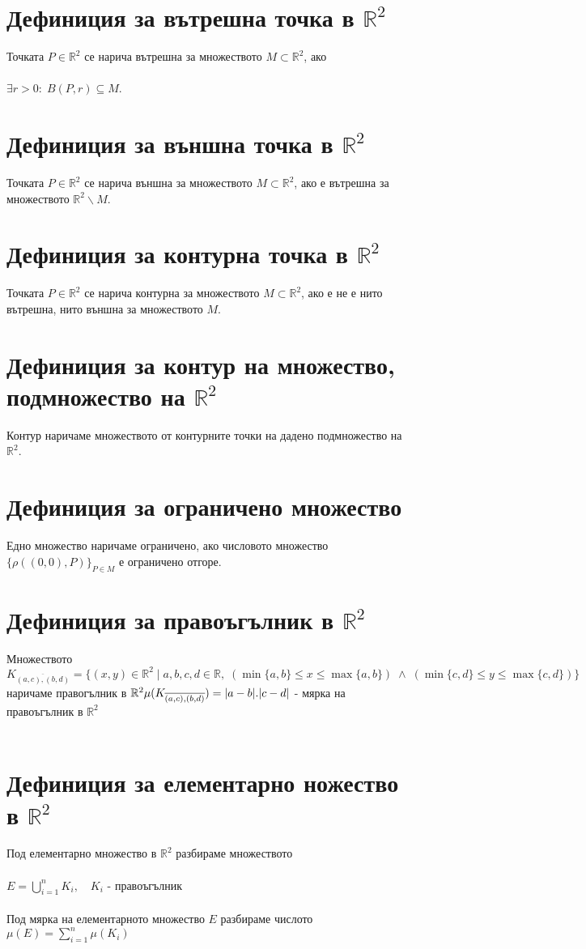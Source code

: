 \documentclass[14pt]{extarticle}
\newcommand{\R}{\mathbb{R}}
\newcommand{\Sum}{\displaystyle\sum}
\begin{document}
\section*{Дефиниция за вътрешна точка в \(\R^2\)}
Точката \(P \in \R^2\) се нарича вътрешна за множеството \(M \subset \R^2\), ако \\\\
\(\exists r > 0 : \; B(P,r) \subseteq M\).
\section*{Дефиниция за външна точка в \(\R^2\)}
Точката \(P \in \R^2\) се нарича външна за множеството \(M \subset \R^2\), ако е вътрешна за множеството \(\R^2\backslash M\).
\section*{Дефиниция за контурна точка в \(\R^2\)}
Точката \(P \in \R^2\) се нарича контурна за множеството \(M \subset \R^2\), ако е не е нито вътрешна, нито външна за множеството \(M\).
\section*{Дефиниция за контур на множество, подмножество на \(\R^2\)}
Контур наричаме множеството от контурните точки на дадено подмножество на \(\R^2\).
\section*{Дефиниция за ограничено множество}
Едно множество наричаме ограничено, ако числовото множество \(\{\rho((0, 0), P)\}_{P \in M}\) е ограничено отгоре.  
\section*{Дефиниция за правоъгълник в \(\R^2\)}
Множеството \(K_{\overline{(a, c), (b, d)}} = \{(x, y) \in \R^2 \; | \; a, b, c, d \in \R, \;  (\min\{a, b\} \leq x \leq \max\{a, b\}) \; \land \; (\min\{c, d\} \leq y \leq \max\{c, d\}) \}\) наричаме правогълник в \(\R^2 \\\\
\mu(K_{\overline{(a, c), (b, d)}}) = |a - b|.|c - d|\) - мярка на правоъгълник в \(\R^2\) \\\\
\section*{Дефиниция за елементарно ножество в \(\R^2\)}
Под елементарно множество в \(\R^2\) разбираме множеството \\\\
\(E = \bigcup_{i = 1}^n K_i, \quad K_i\) - правоъгълник \\\\
Под мярка на елементарното множество \(E\) разбираме числото \(\mu(E) = \Sum_{i = 1}^n \mu(K_i)\)
\end{document}
